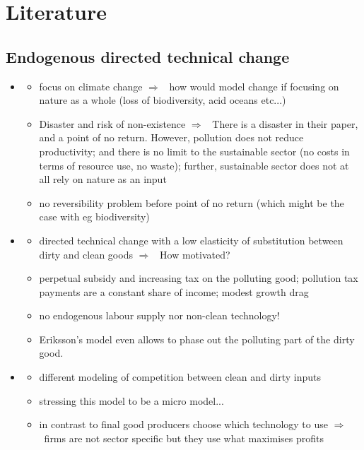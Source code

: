 \documentclass[12pt]{article}
\newcommand{\ar}{$\Rightarrow$ \ }
\begin{document}
\section{Literature}
\subsection{Endogenous directed technical change}
\begin{itemize}
	\item \cite{Acemoglu2012TheChange}
	\begin{itemize}
		\item focus on climate change \ar how would model change if focusing on nature as a whole (loss of biodiversity, acid oceans etc...)
\item 	Disaster and risk of non-existence \ar There is a disaster in their paper, and a point of no return. However, pollution does not reduce productivity; and there is no limit to the sustainable sector (no costs in terms of resource use, no waste); further, sustainable sector does not at all rely on nature as an input
\item no reversibility problem before point of no return (which might be the case with eg biodiversity)
	\end{itemize}	
	\item \cite{Eriksson2018PhasingChange}
	\begin{itemize}
\item directed technical change with  a low elasticity of substitution between dirty and clean goods \ar How motivated?
\item perpetual subsidy and increasing tax on the polluting good; pollution tax payments are a constant share of income; modest growth drag
\item no endogenous labour supply nor non-clean technology!
\item Eriksson's model even allows to phase out the polluting part of the dirty good. 
	\end{itemize}
\item \cite{Acemoglu2016TransitionTechnology}
\begin{itemize}
	\item different modeling of competition between clean and dirty inputs
	\item stressing this model to be a micro model...
	\item in contrast to \cite{Acemoglu2012TheChange} final good producers choose which technology to use \ar firms are not sector specific but they use what maximises profits 

\end{itemize}
\end{itemize}
\end{document}
